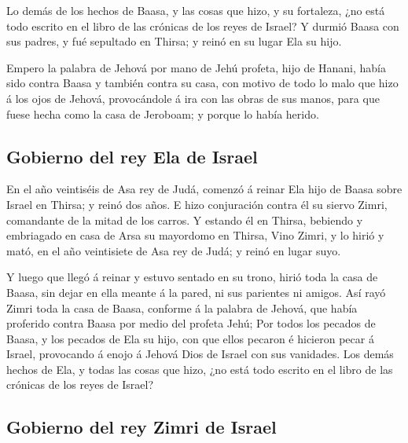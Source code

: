  Lo demás de los hechos de Baasa, y las cosas que hizo, y su
fortaleza, ¿no está todo escrito en el libro de las crónicas de los
reyes de Israel?  Y durmió Baasa con sus padres, y fué
sepultado en Thirsa; y reinó en su lugar Ela su hijo.

 Empero la palabra de Jehová por mano de Jehú profeta, hijo
de Hanani, había sido contra Baasa y también contra su casa, con motivo
de todo lo malo que hizo á los ojos de Jehová, provocándole á ira con
las obras de sus manos, para que fuese hecha como la casa de Jeroboam; y
porque lo había herido.

\hypertarget{gobierno-del-rey-ela-de-israel}{%
\subsection{Gobierno del rey Ela de
Israel}\label{gobierno-del-rey-ela-de-israel}}

 En el año veintiséis de Asa rey de Judá, comenzó á reinar
Ela hijo de Baasa sobre Israel en Thirsa; y reinó dos años. 
E hizo conjuración contra él su siervo Zimri, comandante de la mitad de
los carros. Y estando él en Thirsa, bebiendo y embriagado en casa de
Arsa su mayordomo en Thirsa,  Vino Zimri, y lo hirió y
mató, en el año veintisiete de Asa rey de Judá; y reinó en lugar suyo.

 Y luego que llegó á reinar y estuvo sentado en su trono,
hirió toda la casa de Baasa, sin dejar en ella meante á la pared, ni sus
parientes ni amigos.  Así rayó Zimri toda la casa de Baasa,
conforme á la palabra de Jehová, que había proferido contra Baasa por
medio del profeta Jehú;  Por todos los pecados de Baasa, y
los pecados de Ela su hijo, con que ellos pecaron é hicieron pecar á
Israel, provocando á enojo á Jehová Dios de Israel con sus vanidades.
 Los demás hechos de Ela, y todas las cosas que hizo, ¿no
está todo escrito en el libro de las crónicas de los reyes de Israel?

\hypertarget{gobierno-del-rey-zimri-de-israel}{%
\subsection{Gobierno del rey Zimri de
Israel}\label{gobierno-del-rey-zimri-de-israel}}

